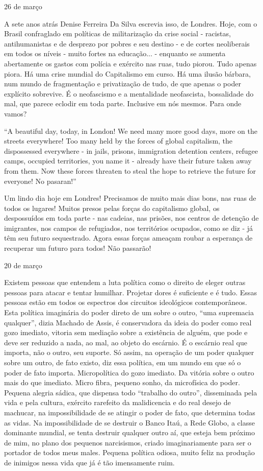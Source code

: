 26 de março

A sete anos atrás Denise Ferreira Da Silva escrevia isso, de Londres.
Hoje, com o Brasil confraglado em políticas de militarização da crise
social - racistas, antihumanistas e de desprezo por pobres e seu destino
- e de cortes neoliberais em todos os níveis - muito fortes na
educação... - enquanto se aumenta abertamente os gastos com polícia e
exército nas ruas, tudo piorou. Tudo apenas piora. Há uma crise mundial
do Capitalismo em curso. Há uma ilusão bárbara, num mundo de
fragmentação e privatização de tudo, de que apenas o poder explícito
sobrevive. É o neofascismo e a mentalidade neofascista, bossalidade do
mal, que parece eclodir em toda parte. Inclusive em nós mesmos. Para
onde vamos?

``A beautiful day, today, in London! We need many more good days, more
on the streets everywhere! Too many held by the forces of global
capitalism, the dispossessed everywhere - in jails, prisons, immigration
detention centers, refugee camps, occupied territories, you name it -
already have their future taken away from them. Now these forces
threaten to steal the hope to retrieve the future for everyone! No
pasaran!''

Um lindo dia hoje em Londres! Precisamos de muito mais dias bons, nas
ruas de todos os lugares! Muitos presos pelas forças do capitalismo
global, os despossuídos em toda parte - nas cadeias, nas prisões, nos
centros de detenção de imigrantes, nos campos de refugiados, nos
territórios ocupados, como se diz - já têm seu futuro sequestrado. Agora
essas forças ameaçam roubar a esperança de recuperar um futuro para
todos! Não passarão!

20 de março

Existem pessoas que entendem a luta política como o direito de eleger
outras pessoas para atacar e tentar humilhar. Projetar dores é
suficiente e é tudo. Essas pessoas estão em todos os espectros dos
circuitos ideológicos contemporâneos. Esta política imaginária do poder
direto de um sobre o outro, ``uma supremacia qualquer'', dizia Machado
de Assis, é conservadora da ideia do poder como real gozo imediato,
vitoria sem mediação sobre a existência de alguém, que pode e deve ser
reduzido a nada, ao mal, ao objeto do escárnio. É o escárnio real que
importa, não o outro, seu suporte. Só assim, na operação de um poder
qualquer sobre um outro, de fato existo, diz essa política, em um mundo
em que só o poder de fato importa. Micropolítica do gozo imediato. Da
vitória sobre o outro mais do que imediato. Micro fibra, pequeno sonho,
da microfísica do poder. Pequena alegria sádica, que dispensa todo
``trabalho do outro'', disseminada pela vida e pela cultura, exército
rarefeito da malidicencia e do real desejo de machucar, na
impossibilidade de se atingir o poder de fato, que determina todas as
vidas. Na impossibilidade de se destruir o Banco Itaú, a Rede Globo, a
classe dominante mundial, se tenta destruir qualquer outro aí, que
esteja bem próximo de mim, no plano dos pequenos narcisismos, criado
imaginariamente para ser o portador de todos meus males. Pequena
política odiosa, muito feliz na produção de inimigos nessa vida que já é
tão imensamente ruim.

